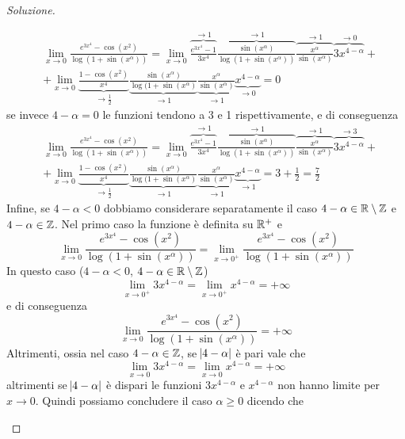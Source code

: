 \begin{proof}[Soluzione]
\begin{enumerate}[(i)]
        \[
        \begin{split}
            &\lim_{x\to 0} \frac{e^{3x^4}-\cos(x^2)}{\log(1+\sin(x^\alpha))} = \lim_{x\to 0} \overbrace{\frac{e^{3x^4}-1}{3x^4}}^{\to 1}\overbrace{\frac{\sin(x^\alpha)}{\log(1+\sin(x^\alpha))}}^{\to 1}\overbrace{\frac{x^\alpha}{\sin(x^\alpha)}}^{\to 1} \overbrace{3x^{4-\alpha}}^{\to 0} + \\
            & + \lim_{x\to 0}\underbrace{ \frac{1-\cos(x^2)}{x^4}}_{\to \frac{1}{2}}\underbrace{\frac{\sin(x^\alpha)}{\log(1+\sin(x^\alpha)}}_{\to1}\underbrace{\frac{x^\alpha}{\sin(x^\alpha)}}_{\to 1}\underbrace{x^{4-\alpha}}_{\to 0} = 0
        \end{split}
        \]
        se invece $4-\alpha=0$ le funzioni tendono a 3 e 1 rispettivamente, e di conseguenza
        \[
        \begin{split}
            &\lim_{x\to 0} \frac{e^{3x^4}-\cos(x^2)}{\log(1+\sin(x^\alpha))} = \lim_{x\to 0} \overbrace{\frac{e^{3x^4}-1}{3x^4}}^{\to 1}\overbrace{\frac{\sin(x^\alpha)}{\log(1+\sin(x^\alpha))}}^{\to 1}\overbrace{\frac{x^\alpha}{\sin(x^\alpha)}}^{\to 1} \overbrace{3x^{4-\alpha}}^{\to 3} + \\
            & + \lim_{x\to 0}\underbrace{ \frac{1-\cos(x^2)}{x^4}}_{\to \frac{1}{2}}\underbrace{\frac{\sin(x^\alpha)}{\log(1+\sin(x^\alpha)}}_{\to1}\underbrace{\frac{x^\alpha}{\sin(x^\alpha)}}_{\to 1}\underbrace{x^{4-\alpha}}_{\to 1} = 3 + \frac{1}{2} = \frac{7}{2}
        \end{split}
        \]
        Infine, se $4-\alpha<0$ dobbiamo considerare separatamente il caso $4-\alpha\in\amsbb{R}\setminus \amsbb{Z}$ e $4-\alpha\in \amsbb{Z}$. Nel primo caso la funzione è definita su $\amsbb{R}^+$ e
        \[
        \lim_{x\to 0} \frac{e^{3x^4}-\cos(x^2)}{\log(1+\sin(x^\alpha))} = \lim_{x\to 0^+}\frac{e^{3x^4}-\cos(x^2)}{\log(1+\sin(x^\alpha))}
        \]
        In questo caso ($4-\alpha<0$, $4-\alpha\in\amsbb{R}\setminus \amsbb{Z}$)
        \[
        \lim_{x\to 0^+} 3x^{4-\alpha} = \lim_{x\to 0^+} x^{4-\alpha} = +\infty
        \]
        e di conseguenza
        \[
        \lim_{x\to 0} \frac{e^{3x^4}-\cos(x^2)}{\log(1+\sin(x^\alpha))} = +\infty
        \]
        Altrimenti, ossia nel caso $4-\alpha\in\amsbb{Z}$, se $\abs{4-\alpha}$ è pari vale che
        \[
        \lim_{x\to 0} 3x^{4-\alpha} = \lim_{x\to 0} x^{4-\alpha} = +\infty
        \]
        altrimenti se $\abs{4-\alpha}$ è dispari le funzioni $3x^{4-\alpha}$ e $x^{4-\alpha}$ non hanno limite per $x\to 0$. Quindi possiamo concludere il caso $\alpha\ge 0$ dicendo che

\end{enumerate}
\end{proof}
